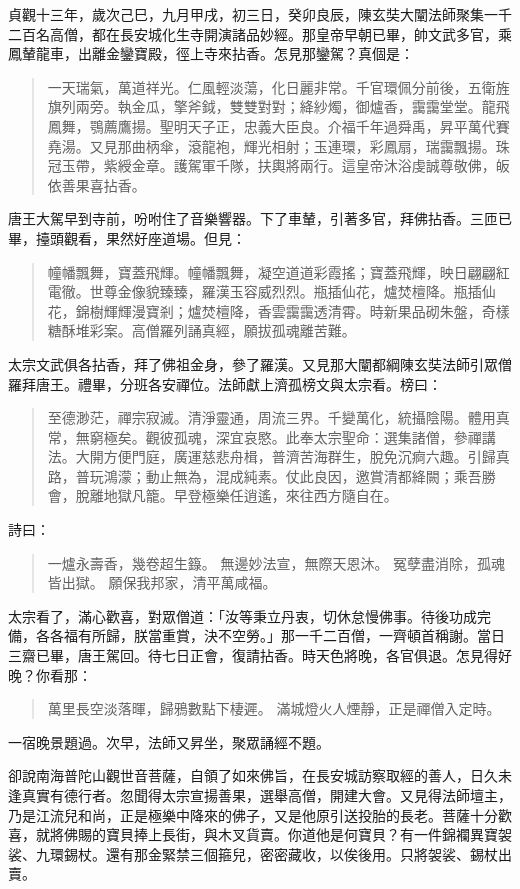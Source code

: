 貞觀十三年，歲次己巳，九月甲戌，初三日，癸卯良辰，陳玄奘大闡法師聚集一千二百名高僧，都在長安城化生寺開演諸品妙經。那皇帝早朝已畢，帥文武多官，乘鳳輦龍車，出離金鑾寶殿，徑上寺來拈香。怎見那鑾駕？真個是：
\begin{quote}
一天瑞氣，萬道祥光。仁風輕淡蕩，化日麗非常。千官環佩分前後，五衛旌旗列兩旁。執金瓜，擎斧鉞，雙雙對對；絳紗燭，御爐香，靄靄堂堂。龍飛鳳舞，鶚薦鷹揚。聖明天子正，忠義大臣良。介福千年過舜禹，昇平萬代賽堯湯。又見那曲柄傘，滾龍袍，輝光相射；玉連環，彩鳳扇，瑞靄飄揚。珠冠玉帶，紫綬金章。護駕軍千隊，扶輿將兩行。這皇帝沐浴虔誠尊敬佛，皈依善果喜拈香。
\end{quote}

唐王大駕早到寺前，吩咐住了音樂響器。下了車輦，引著多官，拜佛拈香。三匝已畢，擡頭觀看，果然好座道場。但見：
\begin{quote}
幢幡飄舞，寶蓋飛輝。幢幡飄舞，凝空道道彩霞搖；寶蓋飛輝，映日翩翩紅電徹。世尊金像貌臻臻，羅漢玉容威烈烈。瓶插仙花，爐焚檀降。瓶插仙花，錦樹輝輝漫寶剎；爐焚檀降，香雲靄靄透清霄。時新果品砌朱盤，奇樣糖酥堆彩案。高僧羅列誦真經，願拔孤魂離苦難。
\end{quote}

太宗文武俱各拈香，拜了佛祖金身，參了羅漢。又見那大闡都綱陳玄奘法師引眾僧羅拜唐王。禮畢，分班各安禪位。法師獻上濟孤榜文與太宗看。榜曰：
\begin{quote}
至德渺茫，禪宗寂滅。清淨靈通，周流三界。千變萬化，統攝陰陽。體用真常，無窮極矣。觀彼孤魂，深宜哀愍。此奉太宗聖命：選集諸僧，參禪講法。大開方便門庭，廣運慈悲舟楫，普濟苦海群生，脫免沉痾六趣。引歸真路，普玩鴻濛；動止無為，混成純素。仗此良因，邀賞清都絳闕；乘吾勝會，脫離地獄凡籠。早登極樂任逍遙，來往西方隨自在。
\end{quote}

詩曰：
\begin{quote}
一爐永壽香，幾卷超生籙。
無邊妙法宣，無際天恩沐。
冤孽盡消除，孤魂皆出獄。
願保我邦家，清平萬咸福。
\end{quote}

太宗看了，滿心歡喜，對眾僧道：「汝等秉立丹衷，切休怠慢佛事。待後功成完備，各各福有所歸，朕當重賞，決不空勞。」那一千二百僧，一齊頓首稱謝。當日三齋已畢，唐王駕回。待七日正會，復請拈香。時天色將晚，各官俱退。怎見得好晚？你看那：
\begin{quote}
萬里長空淡落暉，歸鴉數點下棲遲。
滿城燈火人煙靜，正是禪僧入定時。
\end{quote}

一宿晚景題過。次早，法師又昇坐，聚眾誦經不題。

卻說南海普陀山觀世音菩薩，自領了如來佛旨，在長安城訪察取經的善人，日久未逢真實有德行者。忽聞得太宗宣揚善果，選舉高僧，開建大會。又見得法師壇主，乃是江流兒和尚，正是極樂中降來的佛子，又是他原引送投胎的長老。菩薩十分歡喜，就將佛賜的寶貝捧上長街，與木叉貨賣。你道他是何寶貝？有一件錦襴異寶袈裟、九環錫杖。還有那金緊禁三個箍兒，密密藏收，以俟後用。只將袈裟、錫杖出賣。

